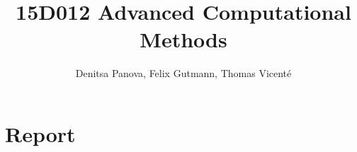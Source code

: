\documentclass[fleqn]{article}
\title{15D012 Advanced Computational Methods}
\author{Denitsa Panova, Felix Gutmann, Thomas Vicenté}
\date{}
\begin{document}
\maketitle

\section*{Report}

\lipsum[2-4]
\end{document}
